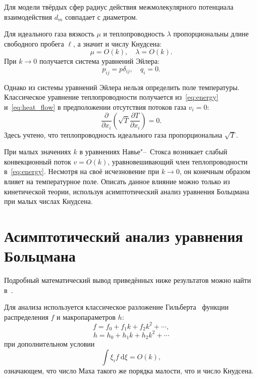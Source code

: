 \documentclass[english,russian,a4paper,10pt]{article}
\newcommand{\dd}{\:\mathrm{d}}
\newcommand{\pder}[2][]{\frac{\partial#1}{\partial#2}}
\begin{document}
Для модели твёрдых сфер радиус действия межмолекулярного потенциала взаимодействия \(d_m\)
совпадает с диаметром.

Для идеального газа вязкость \(\mu\) и теплопроводность \(\lambda\)
пропорциональны длине свободного пробега \(\ell\), а значит и числу Кнудсена:
\begin{equation}
	\mu = O(k), \quad \lambda = O(k).
\end{equation}
При \(k\to0\) получается система уравнений Эйлера:
\begin{equation}
	p_{ij} = p\delta_{ij}, \quad q_i = 0.
\end{equation}

Однако из системы уравнений Эйлера нельзя определить поле температуры.
Классическое уравнение теплопроводности получается из~\eqref{eq:energy} и~\eqref{eq:heat_flow}
в предположении отсутствия потоков газа \(v_i = 0\):
\begin{equation}\label{eq:heat_equation}
	\pder{x_i}\left(\sqrt{T}\pder[T]{x_i}\right) = 0.
\end{equation}
Здесь учтено, что теплопроводность идеального газа пропорциональна \(\sqrt{T}\).

При малых значениях \(k\) в уравнениях Навье"--~Стокса возникает слабый конвекционный поток \(v=O(k)\),
уравновешивающий член теплопроводности в~\eqref{eq:energy}.
Несмотря на своё исчезновение при \(k\to0\), он конечным образом влияет на температурное поле.
Описать данное влияние можно только из кинетической теории, используя асимптотический анализ 
уравнения Больцмана при малых числах Кнудсена.

\section{Асимптотический анализ уравнения Больцмана}
Подробный математический вывод приведённых ниже результатов можно найти в~\cite{Sone2002}.

Для анализа используется классическое разложение Гильберта~\cite{Hilbert1912}
функции распределения \(f\) и макропараметров \(h\):
\[ f = f_0 + f_1k + f_2k^2 + \cdots, \]
\[ h = h_0 + h_1k + h_2k^2 + \cdots \]
при дополнительном условии
\begin{equation}\label{eq:Mach_constraint}
	\int\xi_if\dd\xi = O(k),
\end{equation}
означающем, что число Маха такого же порядка малости, что и число Кнудсена.
\end{document}

